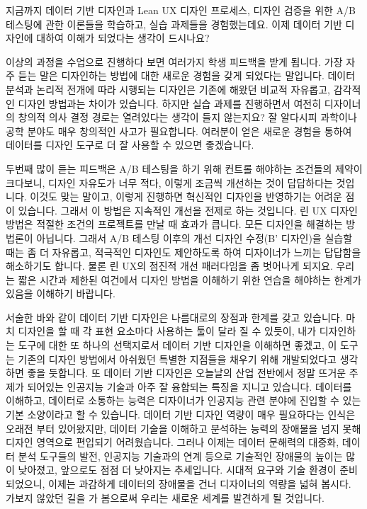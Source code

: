 \documentclass[
  letterpaper,
]{book}
\begin{document}
지금까지 데이터 기반 디자인과 Lean UX 디자인 프로세스, 디자인 검증을
위한 A/B 테스팅에 관한 이론들을 학습하고, 실습 과제들을 경험했는데요.
이제 데이터 기반 디자인에 대하여 이해가 되었다는 생각이 드시나요?

이상의 과정을 수업으로 진행하다 보면 여러가지 학생 피드백을 받게 됩니다.
가장 자주 듣는 말은 디자인하는 방법에 대한 새로운 경험을 갖게 되었다는
말입니다. 데이터 분석과 논리적 전개에 따라 시행되는 디자인은 기존에
해왔던 비교적 자유롭고, 감각적인 디자인 방법과는 차이가 있습니다. 하지만
실습 과제를 진행하면서 여전히 디자이너의 창의적 의사 결정 경로는
열려있다는 생각이 들지 않는지요? 잘 알다시피 과학이나 공학 분야도 매우
창의적인 사고가 필요합니다. 여러분이 얻은 새로운 경험을 통하여 데이터를
디자인 도구로 더 잘 사용할 수 있으면 좋겠습니다.

두번째 많이 듣는 피드백은 A/B 테스팅을 하기 위해 컨트롤 해야하는
조건들의 제약이 크다보니, 디자인 자유도가 너무 적다, 이렇게 조금씩
개선하는 것이 답답하다는 것입니다. 이것도 맞는 말이고, 이렇게 진행하면
혁신적인 디자인을 반영하기는 어려운 점이 있습니다. 그래서 이 방법은
지속적인 개선을 전제로 하는 것입니다. 린 UX 디자인 방법은 적절한 조건의
프로젝트를 만날 때 효과가 큽니다. 모든 디자인을 해결하는 방법론이
아닙니다. 그래서 A/B 테스팅 이후의 개선 디자인 수정(B' 디자인)을 실습할
때는 좀 더 자유롭고, 적극적인 디자인도 제안하도록 하여 디자이너가 느끼는
답답함을 해소하기도 합니다. 물론 린 UX의 점진적 개선 패러다임을 좀
벗어나게 되지요. 우리는 짧은 시간과 제한된 여건에서 디자인 방법을
이해하기 위한 연습을 해야하는 한계가 있음을 이해하기 바랍니다.

서술한 바와 같이 데이터 기반 디자인은 나름대로의 장점과 한계를 갖고
있습니다. 마치 디자인을 할 때 각 표현 요소마다 사용하는 툴이 달라 질 수
있듯이, 내가 디자인하는 도구에 대한 또 하나의 선택지로서 데이터 기반
디자인을 이해하면 좋겠고, 이 도구는 기존의 디자인 방법에서 아쉬웠던
특별한 지점들을 채우기 위해 개발되었다고 생각하면 좋을 듯합니다. 또
데이터 기반 디자인은 오늘날의 산업 전반에서 정말 뜨거운 주제가 되어있는
인공지능 기술과 아주 잘 융합되는 특징을 지니고 있습니다. 데이터를
이해하고, 데이터로 소통하는 능력은 디자이너가 인공지능 관련 분야에
진입할 수 있는 기본 소양이라고 할 수 있습니다. 데이터 기반 디자인 역량이
매우 필요하다는 인식은 오래전 부터 있어왔지만, 데이터 기술을 이해하고
분석하는 능력의 장애물을 넘지 못해 디자인 영역으로 편입되기
어려웠습니다. 그러나 이제는 데이터 문해력의 대중화, 데이터 분석 도구들의
발전, 인공지능 기술과의 연계 등으로 기술적인 장애물의 높이는 많이
낮아졌고, 앞으로도 점점 더 낮아지는 추세입니다. 시대적 요구와 기술
환경이 준비 되었으니, 이제는 과감하게 데이터의 장애물을 건너 디자이너의
역량을 넓혀 봅시다. 가보지 않았던 길을 가 봄으로써 우리는 새로운 세계를
발견하게 될 것입니다.
\end{document}
